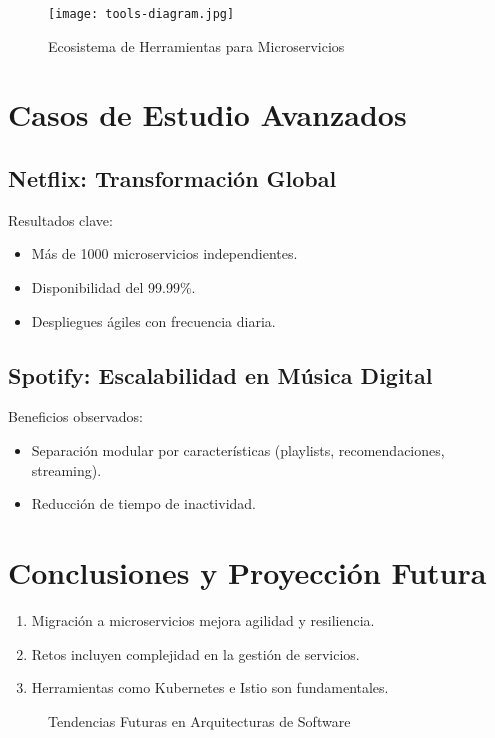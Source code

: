 \documentclass[conference]{IEEEtran}
\begin{document}
\begin{figure}[htbp]
\centering
\texttt{[image: tools-diagram.jpg]}
\caption{Ecosistema de Herramientas para Microservicios}
\label{fig:tools_ecosystem}
\end{figure}

\section{Casos de Estudio Avanzados}

\subsection{Netflix: Transformación Global}
Resultados clave:
\begin{itemize}
    \item Más de 1000 microservicios independientes.
    \item Disponibilidad del 99.99\%.
    \item Despliegues ágiles con frecuencia diaria.
\end{itemize}

\subsection{Spotify: Escalabilidad en Música Digital}
Beneficios observados:
\begin{itemize}
    \item Separación modular por características (playlists, recomendaciones, streaming).
    \item Reducción de tiempo de inactividad.
\end{itemize}

\section{Conclusiones y Proyección Futura}

\begin{enumerate}
    \item Migración a microservicios mejora agilidad y resiliencia.
    \item Retos incluyen complejidad en la gestión de servicios.
    \item Herramientas como Kubernetes e Istio son fundamentales.
\end{enumerate}

\begin{figure}[htbp]
\centering
{}
\caption{Tendencias Futuras en Arquitecturas de Software}
\label{fig:future_trends}
\end{figure}



\end{document}
